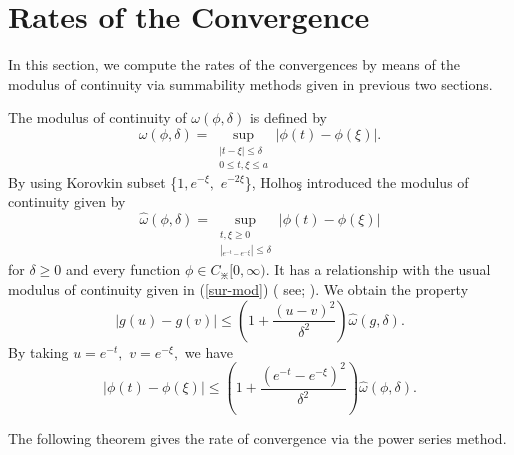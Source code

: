 \documentclass{amsart}
\theoremstyle{plain}
\numberwithin{equation}{section}
\begin{document}
\color{black}



\section{Rates of the Convergence}\label{sec5}

In this section, we compute the rates of the convergences by means of the
modulus of continuity via summability methods given in previous two sections.

The modulus of continuity of $\omega \left(  \phi,\delta \right)  $ is defined
by%
\begin{equation}
\omega \left(  \phi,\delta \right)  =\sup_{\substack{\left \vert t-\xi \right \vert
\leq \delta \\0\leq t,\xi\leq a   }}\left \vert \phi \left(  t\right)
-\phi \left(  \xi \right)  \right \vert .\label{sur-mod}%
\end{equation}
By using Korovkin subset \{$1,e^{-\xi},$ $e^{-2\xi}$\}, Holho\c{s}
\cite{holhos} introduced the modulus of continuity given by
\begin{equation}
\hat{\omega}(\phi,\delta)=\sup_{\substack{t,\xi \geq0\\ \left \vert
_{e^{-t}-e^{-\xi}}\right \vert \leq \delta}}\left \vert \phi(t)-\phi
(\xi)\right \vert \label{ex-sur-mod}%
\end{equation}
for $\delta \geq0$ and every function $\phi \in C_{\divideontimes}[0,\infty)$.
It has a relationship with the usual modulus of continuity given in (\ref{sur-mod}) ( see;
\cite{holhos}). We obtain the property
\begin{equation}
\left \vert g(u)-g(v)\right \vert \leq(1+\dfrac{\left(  u-v\right)  ^{2}}%
{\delta^{2}})\hat{\omega}\left(  g,\delta \right)  .\label{5g}%
\end{equation}
By taking $u=e^{-t},$ $v=e^{-\xi},$ we have%
\begin{equation}
\left \vert \phi \left(  t\right)  -\phi \left(  \xi \right)  \right \vert
\leq \left(  1+\dfrac{\left(  e^{-t}-e^{-\xi}\right)  ^{2}}{\delta^{2}}\right)
\hat{\omega}(\phi,\delta).\label{5h}%
\end{equation}

The following theorem gives the rate of convergence via the power series method.
\end{document}
